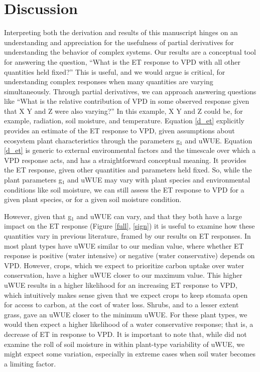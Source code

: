 \section{Discussion}
\label{discussion}

Interpreting both the derivation and results of this manuscript hinges
on an understanding and appreciation for the usefulness of partial
derivatives for understanding the behavior of complex systems. Our
results are a conceptual tool for answering the question, ``What is
the ET response to VPD with all other quantities held fixed?'' This is
useful, and we would argue is critical, for understanding complex
responses when many quantities are varying simultaneously. Through
partial derivatives, we can approach answering questions like ``What
is the relative contribution of VPD in some observed response given
that X Y and Z were also varying?'' In this example, X Y and Z could
be, for example, radiation, soil moisture, and temperature. Equation
\ref{d_et} explicitly provides an estimate of the ET response to VPD,
given assumptions about ecosystem plant characteristics through the
parameters g$_1$ and uWUE. Equation \ref{d_et} is generic to external
environmental factors and the timescale over which a VPD response
acts, and has a straightforward conceptual meaning. It provides the ET
response, given other quantities and parameters held fixed. So, while
the plant parameters g$_1$ and uWUE may vary with plant species and
environmental conditions like soil moisture, we can still assess the
ET response to VPD for a given plant species, or for a given soil
moisture condition.

However, given that g$_1$ and uWUE can vary, and that they both have a
large impact on the ET response (Figure \ref{full}, \ref{sign}) it is
useful to examine how these quantities vary in previous literature,
framed by our results on ET responses. In \citet{Zhou_2015} most plant
types have uWUE similar to our median value, where whether ET
response is positive (water intensive) or negative (water conservative)
depends on VPD. However, crops, which we expect to prioritize carbon
uptake over water conservation, have a higher uWUE closer to our
maximum value. This higher uWUE results in a higher likelihood for an
increasing ET response to VPD, which intuitively makes sense given
that we expect crops to keep stomata open for access to carbon, at the
cost of water loss. Shrubs, and to a lesser extent grass, gave an uWUE
closer to the minimum uWUE. For these plant types, we would then
expect a higher likelihood of a water conservative response; that is, a
decrease of ET in response to VPD. It is important to note that, while
\citet{Zhou_2015} did not examine the roll of soil moisture in within
plant-type variability of uWUE, we might expect some variation,
especially in extreme cases when soil water becomes a limiting factor.

